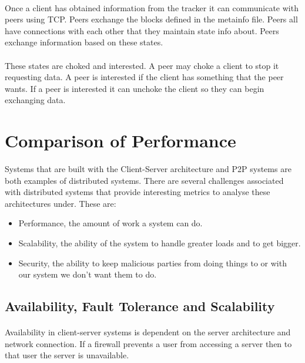 \documentclass[11pt]{amsart}
\begin{document}
\paragraph{}

Once a client has obtained information from the tracker it can communicate with peers using TCP. Peers exchange the blocks defined in the metainfo file. Peers all have connections with each other that they maintain state info about. Peers exchange information based on these states.
\paragraph{}
These states are choked and interested. A peer may choke a client to stop it requesting data. A peer is interested if the client has something that the peer wants. If a peer is interested it can unchoke the client so they can begin exchanging data.

\section{Comparison of Performance}

Systems that are built with the Client-Server architecture and P2P systems are both examples of distributed systems. There are several challenges associated with distributed systems that provide interesting metrics to analyse these architectures under. These are:

\begin{itemize}
  \item Performance, the amount of work a system can do. 
  \item Scalability, the ability of the system to handle greater loads and to get bigger. 
  \item Security, the ability to keep malicious parties from doing things to or with our system we don't want them to do.
\end{itemize}

\subsection{Availability, Fault Tolerance and Scalability}

\paragraph{}

Availability in client-server systems is dependent on the server architecture and network connection. If a firewall prevents a user from accessing a server then to that user the server is unavailable.
\end{document}
